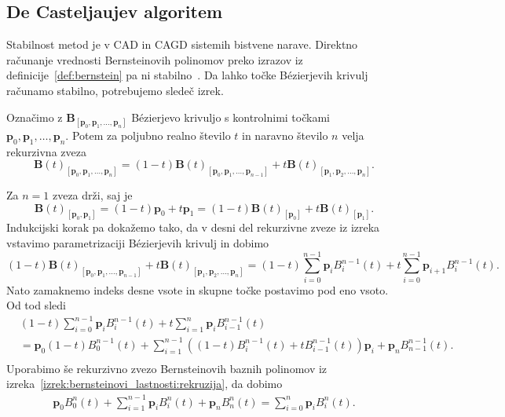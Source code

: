 \documentclass[isrm2, tisk]{fmfdelo}
\newcommand{\p}{\mathbf{p}}
\newcommand{\lilb}[2]{B_{#1}^{#2}(t)}
\newcommand{\bigbbt}{\textbf{B}(t)}
\newcommand{\bernsteinsump}[2]{\sum_{#1=0}^{#2} \p_{#1}\lilb{#1}{#2}}
\begin{document}
    \subsection{De Casteljaujev algoritem}
    Stabilnost metod je v CAD in CAGD sistemih bistvene narave.
    Direktno računanje vrednosti Bernsteinovih polinomov preko izrazov iz definicije~\ref{def:bernstein} pa ni stabilno~\cite{stability}.
    Da lahko točke Bézierjevih krivulj računamo stabilno, potrebujemo sledeč izrek.
    \begin{izrek}
        \label{izrek:decastelaju-rekurzija}
        Označimo z $\mathbf{B}_{[\p_0,\p_1,\dots,\p_n]}$ Bézierjevo krivuljo s kontrolnimi točkami \\
        $\p_0,\p_1,\dots,\p_n$.
        Potem za poljubno realno število $t$ in naravno število $n$ velja rekurzivna zveza \[\bigbbt_{[\p_0,\p_1,\dots,\p_n]} = (1-t)\bigbbt_{[\p_0,\p_1,\dots,\p_{n-1}]} +t\bigbbt_{[\p_1,\p_2,\dots,\p_n]}.\]
    \end{izrek}
    \begin{dokaz}
        Za $n=1$ zveza drži, saj je  \[\bigbbt_{[\p_0,\p_1]} = (1-t)\p_0 +t\p_1 = (1-t)\bigbbt_{[\p_0]} +t\bigbbt_{[\p_1]}.\]
        Indukcijski korak pa dokažemo tako, da v desni del rekurzivne zveze iz izreka vstavimo parametrizaciji Bézierjevih krivulj in dobimo
        \[ (1-t) \bigbbt_{[\p_0,\p_1,\dots,\p_{n-1}]}+t\bigbbt_{[\p_1,\p_2,\dots,\p_n]} = (1-t)\bernsteinsump{i}{n-1}+t\sum_{i=0}^{n-1} \p_{i+1}B_i^{n-1}(t).\]
        Nato zamaknemo indeks desne vsote in skupne točke postavimo pod eno vsoto.
        Od tod sledi
        \begin{align*}
            &(1-t)\bernsteinsump{i}{n-1}+ t\sum_{i=1}^{n} \p_{i}B_{i-1}^{n-1}(t) \\
            &= \p_0(1-t)B_{0}^{n-1}(t) + \sum_{i=1}^{n-1}\left((1-t)B_i^{n-1}(t) + tB_{i-1}^{n-1}(t)\right)\p_{i} + \p_n B_{n-1}^{n-1}(t). \\
        \end{align*}
        Uporabimo še rekurzivno zvezo Bernsteinovih baznih polinomov iz izreka~\ref{izrek:bernsteinovi_lastnosti:rekruzija}, da dobimo
        \begin{align*}
            \p_0B_{0}^{n}(t) + \sum_{i=1}^{n-1}\p_{i}B_i^n(t) + \p_n B_{n}^{n}(t) = \sum_{i=0}^{n}\p_{i}B_i^n(t).
        \end{align*}
    \end{dokaz}
\end{document}
